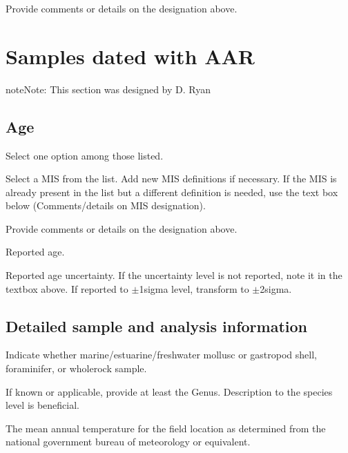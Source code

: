 \documentclass[letterpaper,10pt,english]{sphinxmanual}
\begin{document}
 \sphinxhyphen{} Provide comments or details on the designation above.


\chapter{Samples dated with AAR}
\label{\detokenize{AAR:samples-dated-with-aar}}\label{\detokenize{AAR::doc}}
\begin{sphinxadmonition}{note}{Note:}
This section was designed by D. Ryan
\end{sphinxadmonition}


\section{Age}
\label{\detokenize{AAR:age}}
 \sphinxhyphen{} Select one option among those listed.

 \sphinxhyphen{} Select a MIS from the list. Add new MIS definitions if necessary. If the MIS is already present in the list but a different definition is needed, use the text box below (Comments/details on MIS designation).

 \sphinxhyphen{} Provide comments or details on the designation above.

 \sphinxhyphen{} Reported age.

 \sphinxhyphen{} Reported age uncertainty. If the uncertainty level is not reported, note it in the textbox above. If reported to \(\pm\)1\sphinxhyphen{}sigma level, transform to \(\pm\)2\sphinxhyphen{}sigma.


\section{Detailed sample and analysis information}
\label{\detokenize{AAR:detailed-sample-and-analysis-information}}
 \sphinxhyphen{} Indicate whether marine/estuarine/freshwater mollusc or gastropod shell, foraminifer, or whole\sphinxhyphen{}rock sample.

 \sphinxhyphen{} If known or applicable, provide at least the Genus. Description to the species level is beneficial.

 \sphinxhyphen{} The mean annual temperature for the field location as determined from the national government bureau of meteorology or equivalent.
\end{document}

